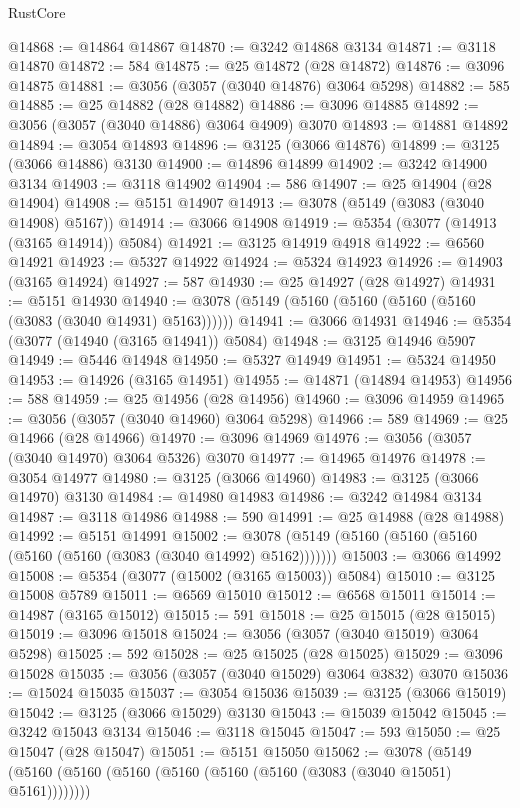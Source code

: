 \begin{lexlean}{RustCore}
\begin{coremodule}
@14868 := @14864 @14867
@14870 := @3242 @14868 @3134
@14871 := @3118 @14870
@14872 := 584
@14875 := @25 @14872 (@28 @14872)
@14876 := @3096 @14875
@14881 := @3056 (@3057 (@3040 @14876) @3064 @5298)
@14882 := 585
@14885 := @25 @14882 (@28 @14882)
@14886 := @3096 @14885
@14892 := @3056 (@3057 (@3040 @14886) @3064 @4909) @3070
@14893 := @14881 @14892
@14894 := @3054 @14893
@14896 := @3125 (@3066 @14876)
@14899 := @3125 (@3066 @14886) @3130
@14900 := @14896 @14899
@14902 := @3242 @14900 @3134
@14903 := @3118 @14902
@14904 := 586
@14907 := @25 @14904 (@28 @14904)
@14908 := @5151 @14907
@14913 := @3078 (@5149 (@3083 (@3040 @14908) @5167))
@14914 := @3066 @14908
@14919 := @5354 (@3077 (@14913 (@3165 @14914)) @5084)
@14921 := @3125 @14919 @4918
@14922 := @6560 @14921
@14923 := @5327 @14922
@14924 := @5324 @14923
@14926 := @14903 (@3165 @14924)
@14927 := 587
@14930 := @25 @14927 (@28 @14927)
@14931 := @5151 @14930
@14940 := @3078 (@5149 (@5160 (@5160 (@5160 (@5160 (@3083 (@3040 @14931) @5163))))))
@14941 := @3066 @14931
@14946 := @5354 (@3077 (@14940 (@3165 @14941)) @5084)
@14948 := @3125 @14946 @5907
@14949 := @5446 @14948
@14950 := @5327 @14949
@14951 := @5324 @14950
@14953 := @14926 (@3165 @14951)
@14955 := @14871 (@14894 @14953)
@14956 := 588
@14959 := @25 @14956 (@28 @14956)
@14960 := @3096 @14959
@14965 := @3056 (@3057 (@3040 @14960) @3064 @5298)
@14966 := 589
@14969 := @25 @14966 (@28 @14966)
@14970 := @3096 @14969
@14976 := @3056 (@3057 (@3040 @14970) @3064 @5326) @3070
@14977 := @14965 @14976
@14978 := @3054 @14977
@14980 := @3125 (@3066 @14960)
@14983 := @3125 (@3066 @14970) @3130
@14984 := @14980 @14983
@14986 := @3242 @14984 @3134
@14987 := @3118 @14986
@14988 := 590
@14991 := @25 @14988 (@28 @14988)
@14992 := @5151 @14991
@15002 := @3078 (@5149 (@5160 (@5160 (@5160 (@5160 (@5160 (@3083 (@3040 @14992) @5162)))))))
@15003 := @3066 @14992
@15008 := @5354 (@3077 (@15002 (@3165 @15003)) @5084)
@15010 := @3125 @15008 @5789
@15011 := @6569 @15010
@15012 := @6568 @15011
@15014 := @14987 (@3165 @15012)
@15015 := 591
@15018 := @25 @15015 (@28 @15015)
@15019 := @3096 @15018
@15024 := @3056 (@3057 (@3040 @15019) @3064 @5298)
@15025 := 592
@15028 := @25 @15025 (@28 @15025)
@15029 := @3096 @15028
@15035 := @3056 (@3057 (@3040 @15029) @3064 @3832) @3070
@15036 := @15024 @15035
@15037 := @3054 @15036
@15039 := @3125 (@3066 @15019)
@15042 := @3125 (@3066 @15029) @3130
@15043 := @15039 @15042
@15045 := @3242 @15043 @3134
@15046 := @3118 @15045
@15047 := 593
@15050 := @25 @15047 (@28 @15047)
@15051 := @5151 @15050
@15062 := @3078 (@5149 (@5160 (@5160 (@5160 (@5160 (@5160 (@5160 (@3083 (@3040 @15051) @5161))))))))

\end{coremodule}
\end{lexlean}
